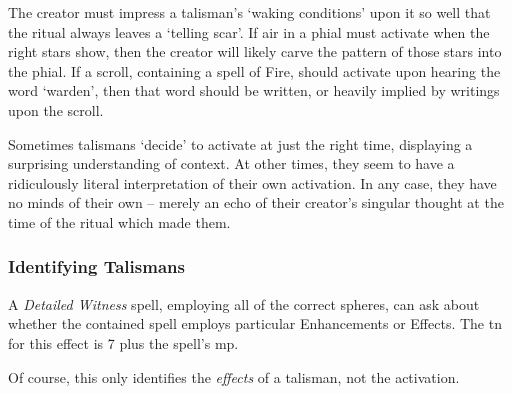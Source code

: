 \begin{multicols}{2}
The creator must impress a talisman's `waking conditions' upon it so well that the ritual always leaves a `telling scar'.
If air in a phial must activate when the right stars show, then the creator will likely carve the pattern of those stars into the phial.
If a scroll, containing a spell of Fire, should activate upon hearing the word `warden', then that word should be written, or heavily implied by writings upon the scroll.

Sometimes talismans `decide' to activate at just the right time, displaying a surprising understanding of context.
At other times, they seem to have a ridiculously literal interpretation of their own activation.
In any case, they have no minds of their own -- merely an echo of their creator's singular thought at the time of the ritual which made them.

\subsubsection{Identifying Talismans}

A \textit{Detailed Witness} spell, employing all of the correct spheres, can ask about whether the contained spell employs particular Enhancements or Effects.
The \gls{tn} for this effect is 7 plus the spell's \gls{mp}.

Of course, this only identifies the \emph{effects} of a talisman, not the activation.

\end{multicols}
